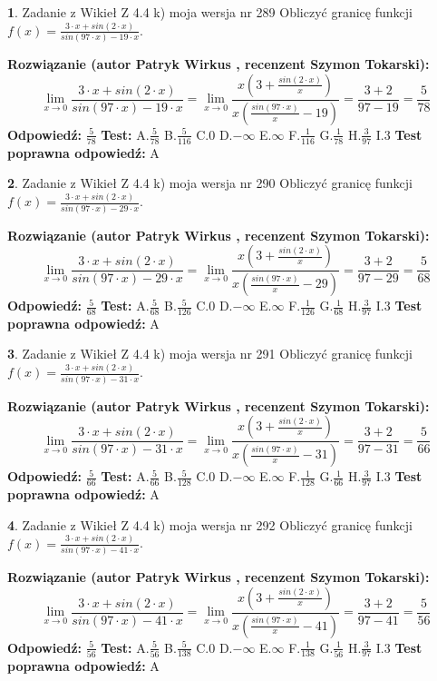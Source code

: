 \documentclass[12pt, a4paper]{article}
\theoremstyle{definition} %
\newtheorem{zad}{}
\newcommand{\zadStart}[1]{\begin{zad}#1\newline}
\newcommand{\zadStop}{\end{zad}}
\newcommand{\rozwStart}[2]{\noindent \textbf{Rozwiązanie (autor #1 , recenzent #2): }\newline}
\newcommand{\rozwStop}{\newline}
\newcommand{\odpStart}{\noindent \textbf{Odpowiedź:}\newline}
\newcommand{\odpStop}{\newline}
\newcommand{\testStart}{\noindent \textbf{Test:}\newline}
\newcommand{\testStop}{\newline}
\newcommand{\kluczStart}{\noindent \textbf{Test poprawna odpowiedź:}\newline}
\newcommand{\kluczStop}{\newline}
\begin{document}
\zadStart{Zadanie z Wikieł Z 4.4 k) moja wersja nr 289}
Obliczyć granicę funkcji $f(x)=\frac{3\cdot x +sin(2\cdot x)}{sin(97\cdot x) -19\cdot x}$.
\zadStop
\rozwStart{Patryk Wirkus}{Szymon Tokarski}
$$\lim\limits_{x\to 0}\frac{3\cdot x +sin(2\cdot x)}{sin(97\cdot x) -19\cdot x}
=\lim\limits_{x\to 0}\frac{x(3+\frac{sin(2\cdot x)}{x})}{x(\frac{sin(97\cdot x)}{x}-19)}
=\frac{3+2}{97-19} = \frac{5}{78}$$
\rozwStop
\odpStart
$\frac{5}{78}$
\odpStop
\testStart
A.$\frac{5}{78}$
B.$\frac{5}{116}$
C.$0$
D.$-\infty$
E.$\infty$
F.$\frac{1}{116}$
G.$\frac{1}{78}$
H.$\frac{3}{97}$
I.$3$
\testStop
\kluczStart
A
\kluczStop



\zadStart{Zadanie z Wikieł Z 4.4 k) moja wersja nr 290}
Obliczyć granicę funkcji $f(x)=\frac{3\cdot x +sin(2\cdot x)}{sin(97\cdot x) -29\cdot x}$.
\zadStop
\rozwStart{Patryk Wirkus}{Szymon Tokarski}
$$\lim\limits_{x\to 0}\frac{3\cdot x +sin(2\cdot x)}{sin(97\cdot x) -29\cdot x}
=\lim\limits_{x\to 0}\frac{x(3+\frac{sin(2\cdot x)}{x})}{x(\frac{sin(97\cdot x)}{x}-29)}
=\frac{3+2}{97-29} = \frac{5}{68}$$
\rozwStop
\odpStart
$\frac{5}{68}$
\odpStop
\testStart
A.$\frac{5}{68}$
B.$\frac{5}{126}$
C.$0$
D.$-\infty$
E.$\infty$
F.$\frac{1}{126}$
G.$\frac{1}{68}$
H.$\frac{3}{97}$
I.$3$
\testStop
\kluczStart
A
\kluczStop



\zadStart{Zadanie z Wikieł Z 4.4 k) moja wersja nr 291}
Obliczyć granicę funkcji $f(x)=\frac{3\cdot x +sin(2\cdot x)}{sin(97\cdot x) -31\cdot x}$.
\zadStop
\rozwStart{Patryk Wirkus}{Szymon Tokarski}
$$\lim\limits_{x\to 0}\frac{3\cdot x +sin(2\cdot x)}{sin(97\cdot x) -31\cdot x}
=\lim\limits_{x\to 0}\frac{x(3+\frac{sin(2\cdot x)}{x})}{x(\frac{sin(97\cdot x)}{x}-31)}
=\frac{3+2}{97-31} = \frac{5}{66}$$
\rozwStop
\odpStart
$\frac{5}{66}$
\odpStop
\testStart
A.$\frac{5}{66}$
B.$\frac{5}{128}$
C.$0$
D.$-\infty$
E.$\infty$
F.$\frac{1}{128}$
G.$\frac{1}{66}$
H.$\frac{3}{97}$
I.$3$
\testStop
\kluczStart
A
\kluczStop



\zadStart{Zadanie z Wikieł Z 4.4 k) moja wersja nr 292}
Obliczyć granicę funkcji $f(x)=\frac{3\cdot x +sin(2\cdot x)}{sin(97\cdot x) -41\cdot x}$.
\zadStop
\rozwStart{Patryk Wirkus}{Szymon Tokarski}
$$\lim\limits_{x\to 0}\frac{3\cdot x +sin(2\cdot x)}{sin(97\cdot x) -41\cdot x}
=\lim\limits_{x\to 0}\frac{x(3+\frac{sin(2\cdot x)}{x})}{x(\frac{sin(97\cdot x)}{x}-41)}
=\frac{3+2}{97-41} = \frac{5}{56}$$
\rozwStop
\odpStart
$\frac{5}{56}$
\odpStop
\testStart
A.$\frac{5}{56}$
B.$\frac{5}{138}$
C.$0$
D.$-\infty$
E.$\infty$
F.$\frac{1}{138}$
G.$\frac{1}{56}$
H.$\frac{3}{97}$
I.$3$
\testStop
\kluczStart
A
\kluczStop
\end{document}
